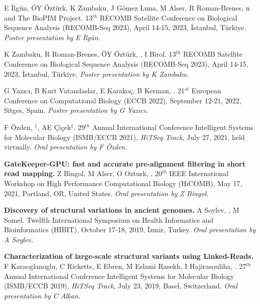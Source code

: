 \vspace{-.2cm}{\bf Characterization of alignment and search algorithms for short read, long read, and graph mappers.} E İlgün, ÖY Öztürk, K Zambaku, J Gómez Luna, M Alser, R Roman-Brenes, \calkan{}n and The BioPIM Project. 13$^{th}$ RECOMB Satellite Conference on Biological Sequence Analysis (RECOMB-Seq 2023), April 14-15, 2023, İstanbul, Türkiye. {\it Poster presentation by E İlgün.}

 K Zambaku, R Roman-Brenes, ÖY Öztürk, \calkan{}, I Birol. 13$^{th}$ RECOMB Satellite Conference on Biological Sequence Analysis (RECOMB-Seq 2023), April 14-15, 2023, İstanbul, Türkiye. {\it Poster presentation by K Zambaku.}



\vspace{-.2cm}{\bf Identification of protein-protein interaction
hubs in multiple sclerosis.} G Yazıcı, B Kurt Vatandaslar, E Karakoç, B Kerman, \calkan{}.
21$^{st}$ European Conference on Computational Biology (ECCB 2022), September 12-21, 2022, Sitges, Spain. 
{\it Poster presentation by G Yazıcı.}

\vspace{-.2cm}{\bf Polishing copy number variant calls on exome sequencing data via deep learning.}
F Özden, \calkan{}$^\ddag$, AE Çiçek$^\ddag$. 29$^{th}$ Annual
International Conference Intelligent Systems for Molecular Biology (ISMB/ECCB 2021), {\em HiTSeq Track},
 July 27, 2021, held virtually. {\it Oral presentation by F Özden.}


\vspace{-.2cm}
{\bf GateKeeper-GPU: fast and accurate pre-alignment filtering in short read mapping.} Z Bingol, M Alser, O Ozturk, \calkan{}. 20$^{th}$ IEEE International Workshop on High Performance Computational Biology (HiCOMB), May 17, 2021, Portland, OR, United States.
{\it Oral presentation by Z Bingol.}



\vspace{-.2cm}
{\bf Discovery of structural variations in ancient genomes.}
A Soylev, \calkan{}, M Somel. 
Twelfth International Symposium on Health Informatics and Bioinformatics (HIBIT), October 17-18, 2019, İzmir, Turkey.
       {\it Oral presentation by A Soylev.}


\vspace{-.2cm}
  {\bf Characterization of large-scale structural variants using Linked-Reads.}
  F Karaoglanoglu, C Ricketts, E Ebren, M Eslami Rasekh, I Hajirasouliha, \calkan{}.
27$^{th}$ Annual
International Conference Intelligent Systems for Molecular Biology (ISMB/ECCB 2019), {\em HiTSeq Track},
 July 23, 2019, Basel, Switzerland. {\it Oral presentation by C Alkan.}




